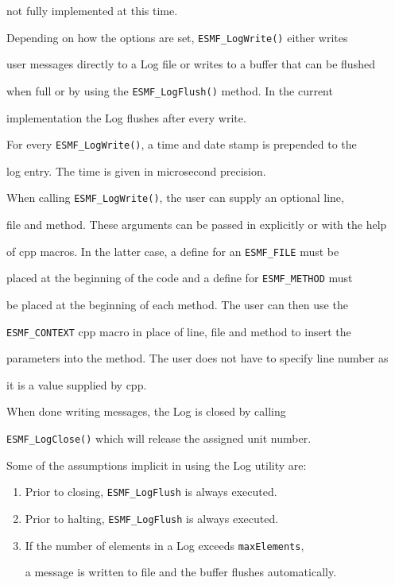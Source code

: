 not fully implemented at this time. 


Depending on how the options are set, {\tt ESMF\_LogWrite()} either writes

user messages directly to a Log file or writes to a buffer that can be flushed

when full or by using the {\tt ESMF\_LogFlush()} method.  In the current

implementation the Log flushes after every write.  


For every {\tt ESMF\_LogWrite()}, a time and date stamp is prepended to the

log entry.  The time is given in microsecond precision.


When calling {\tt ESMF\_LogWrite()}, the user can supply an optional line,

file and method.  These arguments can be passed in explicitly or with the help

of cpp macros.  In the latter case, a define for an {\tt ESMF\_FILE} must be 

placed at the beginning of the code and a define for {\tt ESMF\_METHOD} must

be placed at the beginning of each method.  The user can then use the

{\tt ESMF\_CONTEXT} cpp macro in place of line, file and method to insert the 

parameters into the method.  The user does not have to specify line number as

it is a value supplied by cpp.


When done writing messages, the Log is closed by calling 

{\tt ESMF\_LogClose()} which will release the assigned unit number.


Some of the assumptions implicit in using the Log utility are:


\begin{enumerate}


\item Prior to closing, {\tt ESMF\_LogFlush} is always executed.

\item Prior to halting, {\tt ESMF\_LogFlush} is always executed.

\item If the number of elements in a Log exceeds {\tt maxElements}, 

a message is written to file and the buffer flushes automatically.


\end{enumerate}





